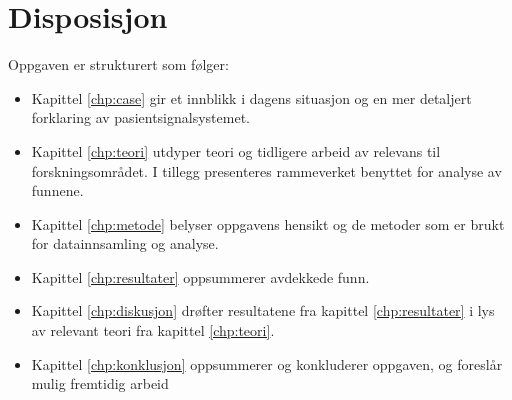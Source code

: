 \section{Disposisjon}
Oppgaven er strukturert som følger:
\begin{itemize}
\item Kapittel \ref{chp:case} gir et innblikk i dagens situasjon og en mer detaljert forklaring av pasientsignalsystemet.
\item Kapittel \ref{chp:teori} utdyper teori og tidligere arbeid av relevans til forskningsområdet. I tillegg presenteres rammeverket benyttet for analyse av funnene.
\item Kapittel \ref{chp:metode} belyser oppgavens hensikt og de metoder som er brukt for datainnsamling og analyse.
\item Kapittel \ref{chp:resultater} oppsummerer avdekkede funn.
\item Kapittel \ref{chp:diskusjon} drøfter resultatene fra kapittel \ref{chp:resultater} i lys av relevant teori fra kapittel \ref{chp:teori}.
\item Kapittel \ref{chp:konklusjon} oppsummerer og konkluderer oppgaven, og foreslår mulig fremtidig arbeid
\end{itemize}

